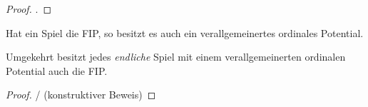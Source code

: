 \begin{proof}.
	
\end{proof}


\begin{satz}
	Hat ein Spiel die FIP, so besitzt es auch ein verallgemeinertes ordinales Potential.
	
	Umgekehrt besitzt jedes \emph{endliche} Spiel mit einem verallgemeinerten ordinalen Potential auch die FIP.
\end{satz}

\begin{proof}
	\cite{MonShap}/\cite{CongGamesPlayerSpecPayoff} (konstruktiver Beweis)
\end{proof}